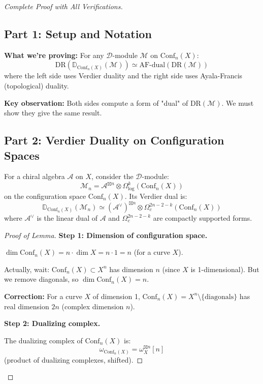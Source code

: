 \begin{proof}[Complete Proof with All Verifications]

\subsection*{Part 1: Setup and Notation}

\textbf{What we're proving:} For any $\mathcal{D}$-module $\mathcal{M}$ on $\text{Conf}_n(X)$:
$$\text{DR}(\mathbb{D}_{\text{Conf}_n(X)}(\mathcal{M})) \simeq \text{AF-dual}(\text{DR}(\mathcal{M}))$$
where the left side uses Verdier duality and the right side uses Ayala-Francis (topological) duality.

\textbf{Key observation:} Both sides compute a form of "dual" of $\text{DR}(\mathcal{M})$. We must show they give the same result.

\subsection*{Part 2: Verdier Duality on Configuration Spaces}

\begin{lemma}\label{lem:verdier-dual-chiral}
For a chiral algebra $\mathcal{A}$ on $X$, consider the $\mathcal{D}$-module:
$$\mathcal{M}_n = \mathcal{A}^{\boxtimes n} \otimes \Omega^k_{\log}(\text{Conf}_n(X))$$
on the configuration space $\text{Conf}_n(X)$. Its Verdier dual is:
$$\mathbb{D}_{\text{Conf}_n(X)}(\mathcal{M}_n) \simeq (\mathcal{A}^\vee)^{\boxtimes n} \otimes \Omega^{2n-2-k}_c(\text{Conf}_n(X))$$
where $\mathcal{A}^\vee$ is the linear dual of $\mathcal{A}$ and $\Omega^{2n-2-k}_c$ are compactly supported forms.
\end{lemma}

\begin{proof}[Proof of Lemma]
\textbf{Step 1: Dimension of configuration space.}

$\dim \text{Conf}_n(X) = n \cdot \dim X = n \cdot 1 = n$ (for a curve $X$).

Actually, wait: $\text{Conf}_n(X) \subset X^n$ has dimension $n$ (since $X$ is 1-dimensional). But we remove diagonals, so $\dim \text{Conf}_n(X) = n$.

\textbf{Correction:} For a curve $X$ of dimension 1, $\text{Conf}_n(X) = X^n \setminus \{\text{diagonals}\}$ has real dimension $2n$ (complex dimension $n$).

\textbf{Step 2: Dualizing complex.}

The dualizing complex of $\text{Conf}_n(X)$ is:
$$\omega_{\text{Conf}_n(X)} = \omega_X^{\boxtimes n}[n]$$
(product of dualizing complexes, shifted).


\end{proof}
\end{proof}
